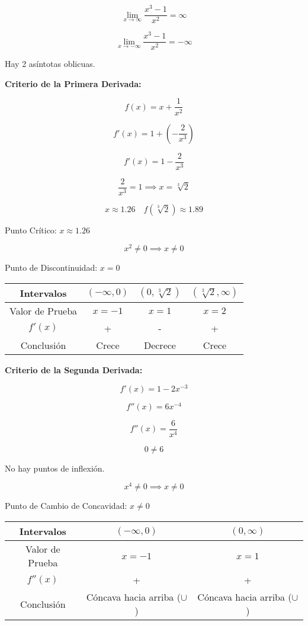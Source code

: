 \[
\lim_{x \to \infty} \frac{x^3 - 1}{x^2} = \infty
\]

\[
\lim_{x \to -\infty} \frac{x^3 - 1}{x^2} = -\infty
\]

Hay 2 asíntotas oblicuas.

\textbf{Criterio de la Primera Derivada:}

\[
f(x) = x + \frac{1}{x^2}
\]

\[
f'(x) = 1 + \left(-\frac{2}{x^3}\right)
\]

\[
f'(x) = 1 - \frac{2}{x^3}
\]

\[
\frac{2}{x^3} = 1 \implies x = \sqrt[3]{2}
\]

\[
x \approx 1.26 \quad f(\sqrt[3]{2}) \approx 1.89
\]

Punto Crítico: \(x \approx 1.26\)

\[
x^2 \neq 0 \implies x \neq 0
\]

Punto de Discontinuidad: \(x = 0\)

\begin{center}
    \begin{tabular}{|c|c|c|c|}
        \hline
        Intervalos & $(-\infty,0)$ & $(0,\sqrt[3]{2})$ & $(\sqrt[3]{2},\infty)$ \\
        \hline
        Valor de Prueba & $x=-1$ & $x=1$ & $x=2$ \\
        \hline
        $f'(x)$ & + & - & + \\
        \hline
        Conclusión & Crece & Decrece & Crece \\
        \hline
    \end{tabular}
\end{center}

\textbf{Criterio de la Segunda Derivada:}

\[
f'(x) = 1 - 2x^{-3}
\]

\[
f''(x) = 6x^{-4}
\]

\[
f''(x) = \frac{6}{x^4}
\]

\[
0 \neq 6
\]

No hay puntos de inflexión.

\[
x^4 \neq 0 \implies x \neq 0
\]

Punto de Cambio de Concavidad: \(x \neq 0\)

\begin{center}
    \begin{tabular}{|c|c|c|}
        \hline
        Intervalos & $(-\infty,0)$ & $(0,\infty)$ \\
        \hline
        Valor de Prueba & $x=-1$ & $x=1$ \\
        \hline
        $f''(x)$ & + & + \\
        \hline
        Conclusión & Cóncava hacia arriba ($\cup$) & Cóncava hacia arriba ($\cup$) \\
        \hline
    \end{tabular}
\end{center}




